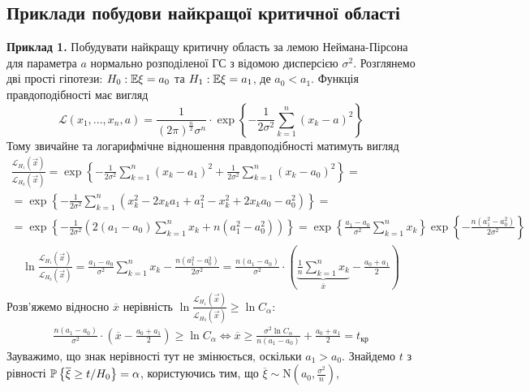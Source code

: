 \subsection{Приклади побудови найкращої критичної області}
\noindent\textbf{Приклад 1.}\label{nko:ex1} Побудувати найкращу критичну область за лемою Неймана-Пірсона
для параметра $a$ нормально розподіленої ГС з відомою дисперсією $\sigma^2$. Розглянемо дві прості гіпотези:
$H_0 : \E\xi = a_0$ та $H_1 : \E\xi = a_1$, де $a_0 < a_1$. Функція правдоподібності має вигляд
$$ \mathcal{L}(x_1, ..., x_n, a) = 
\frac{1}{(2\pi)^{\frac{n}{2}} \sigma^n} \cdot \exp\left\{-\frac{1}{2\sigma^2}\sum\limits_{k=1}^n (x_k - a)^2\right\}$$
Тому звичайне та логарифмічне відношення правдоподібності матимуть вигляд
\begin{gather*}
    \frac{\mathcal{L}_{H_1}(\vec{x})}{\mathcal{L}_{H_0}(\vec{x})} = 
    \exp\left\{ -\frac{1}{2\sigma^2}\sum\limits_{k=1}^n (x_k - a_1)^2 + \frac{1}{2\sigma^2}\sum\limits_{k=1}^n (x_k - a_0)^2\right\} = \\
    = \exp\left\{ -\frac{1}{2\sigma^2}\sum\limits_{k=1}^n \left(x_k^2 - 2x_k a_1 + a_1^2 - x_k^2 + 2x_k a_0 - a_0^2\right)\right\} = \\
    = \exp\left\{ -\frac{1}{2\sigma^2} \left( 2(a_1 - a_0) \sum\limits_{k=1}^n x_k + n(a_1^2 - a_0^2)\right)\right\} = 
    \exp\left\{\frac{a_1 - a_0}{\sigma^2}\sum\limits_{k=1}^n x_k \right\}
    \exp\left\{-\frac{n(a_1^2 - a_0^2)}{2\sigma^2}\right\}
\end{gather*}
\begin{gather*}
    \ln \frac{\mathcal{L}_{H_1}(\vec{x})}{\mathcal{L}_{H_0}(\vec{x})} = 
    \frac{a_1 - a_0}{\sigma^2}\sum\limits_{k=1}^n x_k - \frac{n(a_1^2 - a_0^2)}{2\sigma^2} = 
    \frac{n(a_1 - a_0)}{\sigma^2}\cdot\left(\underbrace{\frac{1}{n}\sum\limits_{k=1}^n x_k}_{\overline{x}} - \frac{a_0 + a_1}{2} \right)
\end{gather*}
Розв'яжемо відносно $\overline{x}$ нерівність $\ln \frac{\mathcal{L}_{H_1}(\vec{x})}{\mathcal{L}_{H_0}(\vec{x})} \geq \ln C_{\alpha}$:
\begin{gather*}
    \frac{n(a_1 - a_0)}{\sigma^2}\cdot \left(\overline{x} - \frac{a_0 + a_1}{2}\right) \geq \ln C_{\alpha} \Leftrightarrow
    \overline{x} \geq \frac{\sigma^2 \ln C_{\alpha}}{n(a_1 - a_0)} + \frac{a_0 + a_1}{2} = t_{\text{кр}}
\end{gather*}
Зауважимо, що знак нерівності тут не змінюється, оскільки $a_1 > a_0$. Знайдемо $t$ з рівності
$\P \left\{\overline{\xi} \geq t / H_0 \right\} = \alpha$, користуючись тим, що $\overline{\xi} \sim \mathrm{N}\left(a_0, \frac{\sigma^2}{n}\right)$, 
